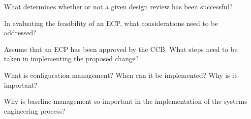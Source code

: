 \begin{exercises}
    \begin{exercise}
    \label{sea-05-18}
        What determines whether or not a given design review has been successful?
    \end{exercise}
    \begin{solution}
    \end{solution}
    
    \begin{exercise}
    \label{sea-05-19}
        In evaluating the feasibility of an ECP, what considerations need to be addressed?
    \end{exercise}
    \begin{solution}
    \end{solution}
    
    \begin{exercise}
    \label{sea-05-20}
        Assume that an ECP has been approved by the CCB. What steps need to be taken in implementing the proposed change?
    \end{exercise}
    \begin{solution}
    \end{solution}
    
    \begin{exercise}
    \label{sea-05-21}
        What is configuration management? When can it be implemented? Why is it important?
    \end{exercise}
    \begin{solution}
    \end{solution}
    
    \begin{exercise}
    \label{sea-05-22}
        Why is baseline management so important in the implementation of the systems engineering process?
    \end{exercise}
    \begin{solution}
    \end{solution}
\end{exercises}
